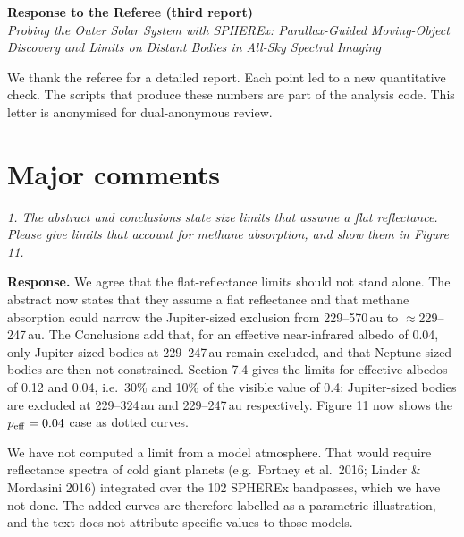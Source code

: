 \documentclass[11pt]{article}
\newenvironment{referee}{\par\color{black!60}\itshape}{\par}
\newcommand{\resp}{\par\noindent\textbf{Response.} }
\begin{document}
\begin{center}
{\large\bfseries Response to the Referee (third report)}\\[4pt]
\emph{Probing the Outer Solar System with SPHEREx: Parallax-Guided Moving-Object Discovery and Limits on Distant Bodies in All-Sky Spectral Imaging}
\end{center}

We thank the referee for a detailed report. Each point led to a new quantitative check. The scripts that produce these numbers are part of the analysis code. This letter is anonymised for dual-anonymous review.

\section*{Major comments}

\begin{referee}
1. The abstract and conclusions state size limits that assume a flat reflectance. Please give limits that account for methane absorption, and show them in Figure 11.
\end{referee}
\resp We agree that the flat-reflectance limits should not stand alone. The abstract now states that they assume a flat reflectance and that methane absorption could narrow the Jupiter-sized exclusion from 229--570\,au to $\approx$229--247\,au. The Conclusions add that, for an effective near-infrared albedo of 0.04, only Jupiter-sized bodies at 229--247\,au remain excluded, and that Neptune-sized bodies are then not constrained. Section 7.4 gives the limits for effective albedos of 0.12 and 0.04, i.e.\ 30\% and 10\% of the visible value of 0.4: Jupiter-sized bodies are excluded at 229--324\,au and 229--247\,au respectively. Figure 11 now shows the $p_{\rm eff} = 0.04$ case as dotted curves.

We have not computed a limit from a model atmosphere. That would require reflectance spectra of cold giant planets (e.g.\ Fortney et al.\ 2016; Linder \& Mordasini 2016) integrated over the 102 SPHEREx bandpasses, which we have not done. The added curves are therefore labelled as a parametric illustration, and the text does not attribute specific values to those models.
\end{document}
